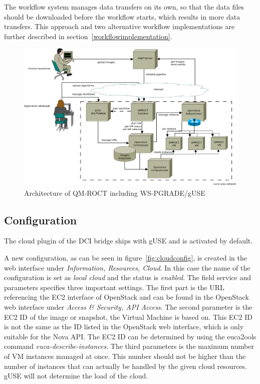 The workflow system manages data transfers on its own, so that the data files should be downloaded before the workflow starts, which results in more data transfers.
This approach and two alternative workflow implementations are further described in section~\ref{workflowimplementation}.

\begin{figure}%
                \centering
                \includegraphics[width=2.0\columnwidth]{images/somno-architecture.png}
                \caption{Architecture of QM-ROCT \cite{wu14} including WS-PGRADE/gUSE}
                \label{fig:architecture}
\end{figure}

\subsection{Configuration}\label{configuration}

The cloud plugin of the DCI bridge ships with gUSE and is activated by default.

A new configuration, as can be seen in figure~\ref{fig:cloudconfig}, is created in the web interface under \textit{Information, Resources, Cloud}.
In this case the name of the configuration is set as \textit{local cloud} and the status is \textit{enabled}. The field service and parameters specifies three important settings.
The first part is the URL referencing the EC2 interface of OpenStack and can be found in the OpenStack web interface under \textit{Access \& Security, API Access}.
The second parameter is the EC2 ID of the image or snapshot, the Virtual Machine is based on.
This EC2 ID is not the same as the ID listed in the OpenStack web interface, which is only suitable for the Nova API.
The EC2 ID can be determined by using the euca2ools command \textit{euca-describe-instances}.
The third parameters is the maximum number of VM instances managed at once.
This number should not be higher than the number of instances that can actually be handled by the given cloud resources.
gUSE will not determine the load of the cloud.

